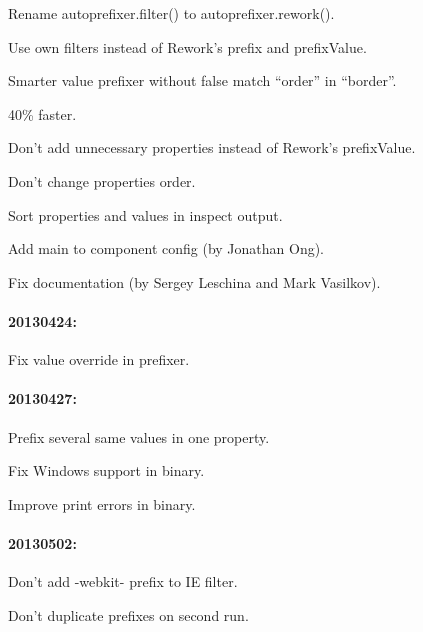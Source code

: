 \begin{DoxyItemize}
\item Rename {\ttfamily autoprefixer.\+filter()} to {\ttfamily autoprefixer.\+rework()}.
\item Use own filters instead of Rework’s {\ttfamily prefix} and {\ttfamily prefix\+Value}.
\item Smarter value prefixer without false match “order” in “border”.
\item 40\% faster.
\item Don’t add unnecessary properties instead of Rework’s {\ttfamily prefix\+Value}.
\item Don’t change properties order.
\item Sort properties and values in inspect output.
\item Add main to component config (by Jonathan Ong).
\item Fix documentation (by Sergey Leschina and Mark Vasilkov).
\end{DoxyItemize}

\paragraph*{20130424\+:}


\begin{DoxyItemize}
\item Fix value override in prefixer.
\end{DoxyItemize}

\paragraph*{20130427\+:}


\begin{DoxyItemize}
\item Prefix several same values in one property.
\item Fix Windows support in binary.
\item Improve print errors in binary.
\end{DoxyItemize}

\paragraph*{20130502\+:}


\begin{DoxyItemize}
\item Don’t add -\/webkit-\/ prefix to IE filter.
\item Don’t duplicate prefixes on second run.
\end{DoxyItemize}

